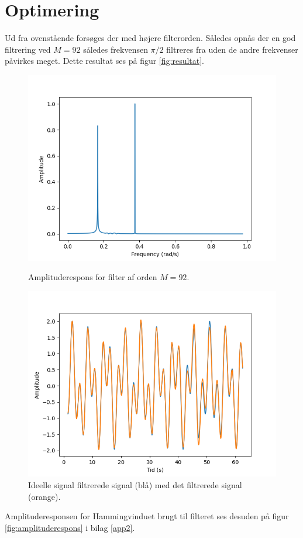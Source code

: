 \section{Optimering}
Ud fra ovenstående forsøges der med højere filterorden. Således opnås der en god filtrering ved $M=92$ således frekvensen $\pi/2$ filtreres fra uden de andre frekvenser påvirkes meget. Dette resultat ses på figur \ref{fig:resultat}.
\begin{figure}[H]
\begin{minipage}{0.49\textwidth}
\centering
\includegraphics[width=\textwidth]{figures/sf1.png}
\caption{Amplituderespons for filter af orden $M=92$.}
\end{minipage}
\begin{minipage}{0.49\textwidth}
\centering
\includegraphics[width=\textwidth]{figures/sf.png}
\caption{Ideelle signal filtrerede signal (blå) med det filtrerede signal (orange).}
\end{minipage}
\end{figure}
Amplituderesponsen for Hammingvinduet brugt til filteret ses desuden på figur \ref{fig:amplituderespons} i bilag \ref{app2}.







